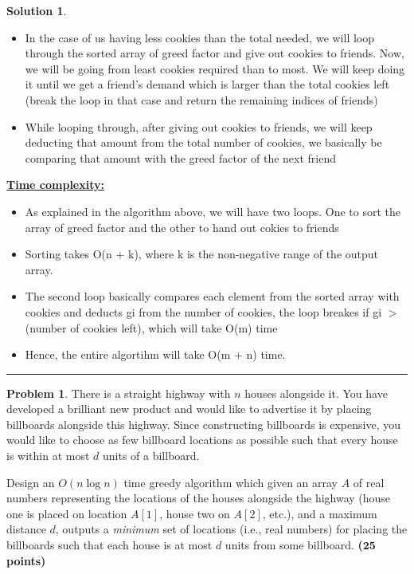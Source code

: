 \documentclass{article}
\theoremstyle{definition}
\newtheorem{problem}{Problem}
\def\fline{\rule{0.75\linewidth}{0.5pt}}
\newcommand{\finishline}{\vspace{-15pt}\begin{center}\fline\end{center}}
\newtheorem*{solution*}{Solution}
\newenvironment{solution}{\begin{solution*}}{{\finishline} \end{solution*}}
\newcommand{\grade}[1]{\hfill{\textbf{($\mathbf{#1}$ points)}}}
\begin{document}
\begin{solution}
\begin{itemize}
			\item In the case of us having less cookies than the total needed, we will loop through the sorted array of greed factor and give out cookies to friends. Now, we will be going from least cookies required than to most. We will keep doing it until we get a friend's demand which is larger than the total cookies left (break the loop in that case and return the remaining indices of friends)
			\item While looping through, after giving out cookies to friends, we will keep deducting that amount from the total number of cookies, we basically be comparing that amount with the greed factor of the next friend 		
	\end{itemize} 
	\textbf{\underline{Time complexity:}}
		\begin{itemize}
			\item As explained in the algorithm above, we will have two loops. One to sort the array of greed factor and the other to hand out cokies to friends
			\item Sorting takes O(n + k), where k is the non-negative range of the output array.
			\item The second loop basically compares each element from the sorted array with cookies and deducts gi from the number of cookies, the loop breakes if gi $>$ (number of cookies left), which will take O(m) time
			\item Hence, the entire algortihm will take O(m + n) time. 
		\end{itemize} 
\end{solution}

\smallskip

\begin{problem}\label{billboard}
	There is a straight highway with $n$ houses alongside it. You have developed a brilliant new product and would like to advertise it by placing billboards alongside this highway. 
	Since constructing billboards is expensive, you would like to choose as few billboard locations as possible such that every house is within at most $d$ units of a billboard. 
	 
	Design an $O(n\log{n})$ time greedy algorithm which given an array $A$ of real numbers representing the locations of the houses alongside the highway (house one is placed on location $A[1]$, house two on $A[2]$, etc.), and a maximum distance $d$,
  	outputs a \emph{minimum} set of locations (i.e., real numbers) for placing the billboards such that each house is at most $d$ units from some billboard. \grade{25}
		
\end{problem}
\end{document}
